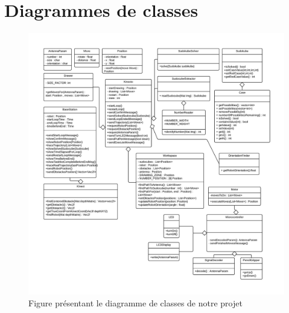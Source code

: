 

\chapter{Diagrammes de classes}
	\label{s:classes}
	\addtolength{\evensidemargin}{-1in}	

\begin{figure}[htbp]
\centering
\label{fig:DiagrammeClasse}
\includegraphics[scale=0.60]{fig/class_diagram.pdf}
\caption{Figure présentant le diagramme de classes de notre projet}
\end{figure}
